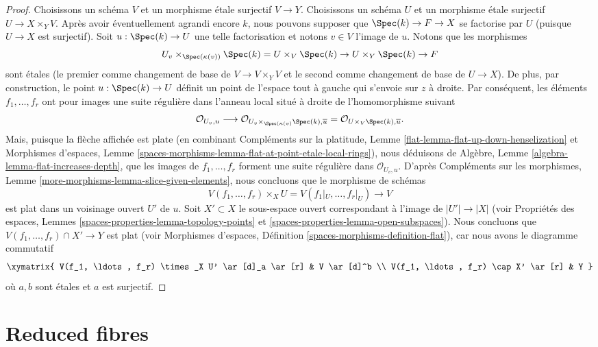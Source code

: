 \begin{proof}
\medskip\noindent
Choisissons un schéma $V$ et un morphisme étale surjectif
$V \to Y$. Choisissons un schéma $U$ et un morphisme étale surjectif
$U \to X \times_Y V$. Après avoir éventuellement agrandi encore $k$, nous pouvons
supposer que $\Spec(k) \to F \to X$ se factorise par $U$ (puisque
$U \to X$ est surjectif). Soit
$u : \Spec(k) \to U$ une telle factorisation et notons $v \in V$
l'image de $u$. Notons que les morphismes
$$
U_v \times_{\Spec(\kappa(v))} \Spec(k) =
U \times_V \Spec(k) \to U \times_Y \Spec(k) \to F
$$
sont étales (le premier comme changement de base de $V \to V \times_Y V$ et
le second comme changement de base de $U \to X$). De plus, par construction,
le point $u : \Spec(k) \to U$ définit un point de l'espace tout à gauche
qui s'envoie sur $z$ à droite. Par conséquent, les éléments
$f_1, \ldots, f_r$ ont pour images une suite régulière dans l'anneau local
situé à droite de l'homomorphisme suivant
$$
\mathcal{O}_{U_v, u}
\longrightarrow
\mathcal{O}_{U_v \times_{\Spec(\kappa(v)} \Spec(k), \overline{u}}
=
\mathcal{O}_{U \times_V \Spec(k), \overline{u}}.
$$
Mais, puisque la flèche affichée est plate (en combinant
Compléments sur la platitude, Lemme \ref{flat-lemma-flat-up-down-henselization}
et
Morphismes d'espaces,
Lemme \ref{spaces-morphisms-lemma-flat-at-point-etale-local-rings}),
nous déduisons de
Algèbre, Lemme \ref{algebra-lemma-flat-increases-depth},
que les images de $f_1, \ldots, f_r$ forment une suite régulière dans
$\mathcal{O}_{U_v, u}$. D'après
Compléments sur les morphismes, Lemme \ref{more-morphisms-lemma-slice-given-elements},
nous concluons que le morphisme de schémas
$$
V(f_1, \ldots, f_r) \times_X U = V(f_1|_U, \ldots, f_r|_U) \to V
$$
est plat dans un voisinage ouvert $U'$ de $u$. Soit $X' \subset X$
le sous-espace ouvert correspondant à l'image de
$|U'| \to |X|$ (voir
Propriétés des espaces, Lemmes
\ref{spaces-properties-lemma-topology-points} et
\ref{spaces-properties-lemma-open-subspaces}).
Nous concluons que $V(f_1, \ldots, f_r) \cap X' \to Y$ est plat
(voir
Morphismes d'espaces, Définition \ref{spaces-morphisms-definition-flat}),
car
nous avons le diagramme commutatif
$$
\xymatrix{
V(f_1, \ldots, f_r) \times_X U' \ar[d]_a \ar[r] & V \ar[d]^b \\
V(f_1, \ldots, f_r) \cap X' \ar[r] & Y
}
$$
où $a, b$ sont étales et $a$ est surjectif.
\end{proof}






\section{Reduced fibres}
\label{section-reduced}

